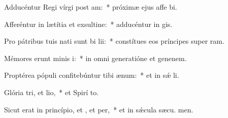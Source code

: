 \item Adducéntur Regi vírgi post am:~* próximæ ejus affe bi.
\item Afferéntur in lætítia et exsultine:~* adducéntur in  gis.
\item Pro pátribus tuis nati sunt bi lii:~* constítues eos príncipes super  ram.
\item Mémores erunt minis i:~* in omni generatióne et genenem.
\item Proptérea pópuli confitebúntur tibi  ænum:~* et in sǽ li.
\item Glória tri, et lio,~* et Spirí to.
\item Sicut erat in princípio, et , et per,~* et in sǽcula sæcu. men.
